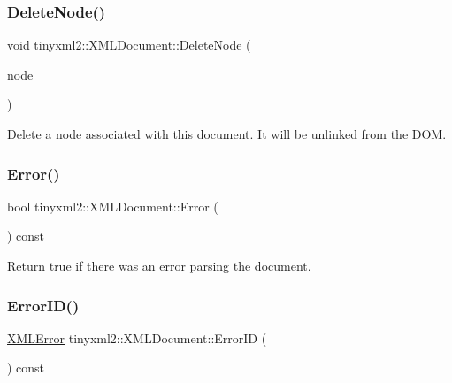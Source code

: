 \subsubsection{\texorpdfstring{Delete\+Node()}{DeleteNode()}}
{\footnotesize\ttfamily void tinyxml2\+::\+X\+M\+L\+Document\+::\+Delete\+Node (\begin{DoxyParamCaption}\item[{\hyperlink{classtinyxml2_1_1_x_m_l_node}{X\+M\+L\+Node} $\ast$}]{node }\end{DoxyParamCaption})}

Delete a node associated with this document. It will be unlinked from the D\+OM. \mbox{\label{classtinyxml2_1_1_x_m_l_document_a34e6318e182e40e3cc4f4ba5d59ed9ed}} 
\subsubsection{\texorpdfstring{Error()}{Error()}}
{\footnotesize\ttfamily bool tinyxml2\+::\+X\+M\+L\+Document\+::\+Error (\begin{DoxyParamCaption}{ }\end{DoxyParamCaption}) const\hspace{0.3cm}{\ttfamily [inline]}}



Return true if there was an error parsing the document. 

\mbox{\label{classtinyxml2_1_1_x_m_l_document_afa3ed33b3107f920ec2b301f805ac17d}} 
\subsubsection{\texorpdfstring{Error\+I\+D()}{ErrorID()}}
{\footnotesize\ttfamily \hyperlink{namespacetinyxml2_a1fbf88509c3ac88c09117b1947414e08}{X\+M\+L\+Error} tinyxml2\+::\+X\+M\+L\+Document\+::\+Error\+ID (\begin{DoxyParamCaption}{ }\end{DoxyParamCaption}) const\hspace{0.3cm}{\ttfamily [inline]}}




